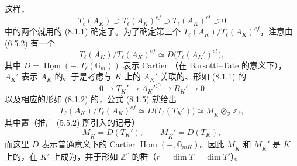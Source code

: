 这样，
\begin{equation}\tag{8.1.4}
 T_\ell(A_K)\supset T_\ell(A_K)^{ef}\supset T_\ell(A_K)^{et}\supset0
\end{equation}
中的两个就用的 (8.1.1) 确定了。为了确定第三个 $T_\ell(A_K)/T_\ell(A_K)^{ef}$，注意由 (6.5.2) 有一个
\begin{equation}\tag{8.1.5}
 T_\ell(A_K)/T_\ell(A_K)^{ef}\simeq D\bigl(T_\ell(A_K')^{et}\bigr),
\end{equation}
其中 $D=\underline{\operatorname{Hom}}(-,T_\ell(\mathbb G_m))$ 表示 Cartier （在 Barsotti--Tate 的意义下），$A_K'$ 表示 $A_K$ 的。于是考虑与 $K$ 上的 $A_K'$ 关联的、形如 (8.1.1) 的
\begin{equation}\tag{8.1.6}
 0\longrightarrow T_K'\longrightarrow A_K'^{\natural0}\longrightarrow B_K'\longrightarrow0
\end{equation}
以及相应的形如 (8.1.2) 的，公式 (8.1.5) 就给出
\begin{equation}\tag{8.1.7}
 T_\ell(A_K)/T_\ell(A_K)^{ef}\simeq D\bigl(T_\ell(T_K')\bigr)
 \simeq\underline M_K\otimes_{\mathbb Z}\mathbb Z_\ell,
\end{equation}
其中置（推广 (5.5.2) 所引入的记号）
\begin{equation}\tag{8.1.8}
 \underline M_K=D(T_K'),\qquad \underline M_K'=D(T_K),
\end{equation}
而这里 $D$ 表示普通意义下的 Cartier  $\underline{\operatorname{Hom}}(-,\mathbb G_{mK})$。因此 $\underline M_K$ 和 $\underline M_K'$ 是 $K$ 上的，在 $K'$ 上成为，并于形如 $\mathbb Z^r$ 的群（$r=\dim T=\dim T'$）。

